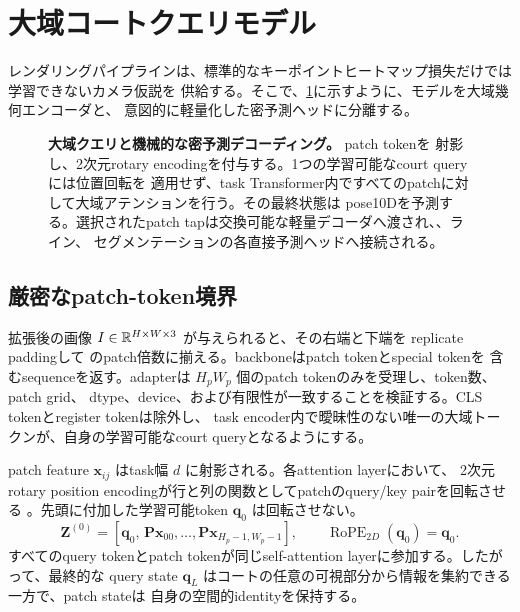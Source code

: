 \section{大域コートクエリモデル}
\label{sec:model}

レンダリングパイプラインは、標準的なキーポイントヒートマップ損失だけでは学習できないカメラ仮説を
供給する。そこで、\cref{fig:model}に示すように、モデルを大域幾何エンコーダと、
意図的に軽量化した密予測ヘッドに分離する。

\begin{figure}[t]
  \centering
  \resizebox{\linewidth}{!}{}
  \caption{\textbf{大域クエリと機械的な密予測デコーディング。}  \DINO{} patch tokenを
  射影し、2次元rotary encodingを付与する。1つの学習可能なcourt queryには位置回転を
  適用せず、task Transformer内ですべてのpatchに対して大域アテンションを行う。その最終状態は
  pose10Dを予測する。選択されたpatch tapは交換可能な軽量デコーダへ渡され、\KP{}、ライン、
  セグメンテーションの各直接予測ヘッドへ接続される。}
  \label{fig:model}
\end{figure}

\subsection{厳密なpatch-token境界}

拡張後の画像 \(I\in\mathbb{R}^{H\times W\times 3}\) が与えられると、その右端と下端を
replicate paddingして \DINO{} のpatch倍数に揃える。backboneはpatch tokenとspecial tokenを
含むsequenceを返す。adapterは \(H_pW_p\) 個のpatch tokenのみを受理し、token数、patch grid、
dtype、device、および有限性が一致することを検証する。CLS tokenとregister tokenは除外し、
task encoder内で曖昧性のない唯一の大域トークンが、自身の学習可能なcourt queryとなるようにする。

patch feature \(\mathbf{x}_{ij}\) はtask幅 \(d\) に射影される。各attention layerにおいて、
2次元rotary position encodingが行と列の関数としてpatchのquery/key pairを回転させる
\citep{su2021roformer}。先頭に付加した学習可能token \(\mathbf{q}_0\) は回転させない。
\begin{equation}
  \mathbf{Z}^{(0)}=
  [\mathbf{q}_0,\,\mathbf{P}\mathbf{x}_{00},\ldots,
   \mathbf{P}\mathbf{x}_{H_p-1,W_p-1}],
  \qquad
  \operatorname{RoPE}_{2D}(\mathbf{q}_0)=\mathbf{q}_0.
  \label{eq:query_input}
\end{equation}
すべてのquery tokenとpatch tokenが同じself-attention layerに参加する。したがって、最終的な
query state \(\mathbf{q}_L\) はコートの任意の可視部分から情報を集約できる一方で、patch stateは
自身の空間的identityを保持する。

